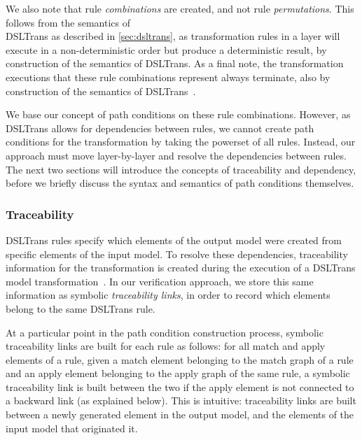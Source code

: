 We also note that rule \textit{combinations} are created, and not rule
\textit{permutations}. This follows from the semantics of \\DSLTrans as described
in \cref{sec:dsltrans}, as transformation rules in a layer will execute in a
non-deterministic order but produce a deterministic result, by construction of the semantics of DSLTrans. As a final
note, the transformation executions that these rule combinations represent always terminate, also by construction of the semantics of DSLTrans~\cite{DBLP:conf/sle/BarrocaLAFS10}.

We base our concept of path conditions on these rule combinations. However, as
DSLTrans allows for dependencies between rules, we cannot create path conditions
for the transformation by taking the powerset of all rules. Instead, our
approach must move layer-by-layer and resolve the dependencies between rules.
The next two sections will introduce the concepts of traceability and dependency, before we
briefly discuss the syntax and semantics of path conditions themselves.

\subsubsection{Traceability}
\label{subsubsec:traceability}

DSLTrans rules specify which elements of the
output model were created from specific elements of the input model. To resolve
these dependencies, traceability information for the transformation is created
during the execution of a DSLTrans model transformation~\cite{DBLP:conf/sle/BarrocaLAFS10}.
In our verification approach, we store this same information as symbolic \emph{traceability links}, in
order to record which elements belong to the same DSLTrans rule.


At a particular point in the path condition construction process, symbolic traceability links are built for
each rule as follows: for all match and apply elements of a rule, given a match
element belonging to the match graph of a rule and an apply element belonging to
the apply graph of the same rule, a symbolic traceability link is built between the two
if the apply element is not connected to a backward link (as explained below).
This is intuitive: traceability links are built between a newly generated
element in the output model, and the elements of the input model that originated
it.

